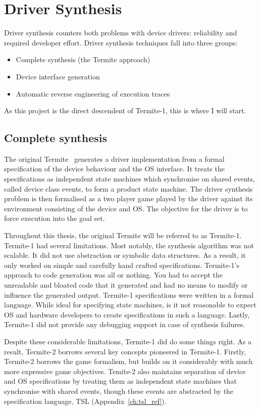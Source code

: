 \section{Driver Synthesis}

Driver synthesis counters both problems with device drivers: reliability and required developer effort. Driver synthesis techniques fall into three groups:
\begin{itemize}
    \item Complete synthesis (the Termite approach)
    \item Device interface generation
    \item Automatic reverse engineering of execution traces
\end{itemize}

As this project is the direct descendent of Termite-1, this is where I will start.

\subsection{Complete synthesis}

The original Termite~\cite{Ryzhyk_CKSH_09} generates a driver implementation from a formal specification of the device behaviour and the OS interface. It treats the specifications as independent state machines which synchronise on shared events, called device class events, to form a product state machine. The driver synthesis problem is then formalised as a two player game played by the driver against its environment consisting of the device and OS. The objective for the driver is to force execution into the goal set. 

Throughout this thesis, the original Termite will be referred to as Termite-1. Termite-1 had several limitations. Most notably, the synthesis algorithm was not scalable. It did not use abstraction or symbolic data structures. As a result, it only worked on simple and carefully hand crafted specifications. Termite-1's approach to code generation was all or nothing. You had to accept the unreadable and bloated code that it generated and had no means to modify or influence the generated output. Termite-1 specifications were written in a formal language. While ideal for specifying state machines, is it not reasonable to expect OS and hardware developers to create specifications in such a language. Lastly, Termite-1 did not provide any debugging support in case of synthesis failures.

Despite these considerable limitations, Termite-1 did do some things right. As a result, Termite-2 borrows several key concepts pioneered in Termite-1. Firstly, Termite-2 borrows the game formalism, but builds on it considerably with much more expressive game objectives. Temite-2 also maintains separation of device and OS specifications by treating them as independent state machines that synchronise with shared events, though these events are abstracted by the specification language, TSL (Appendix~\ref{ch:tsl_ref}).

